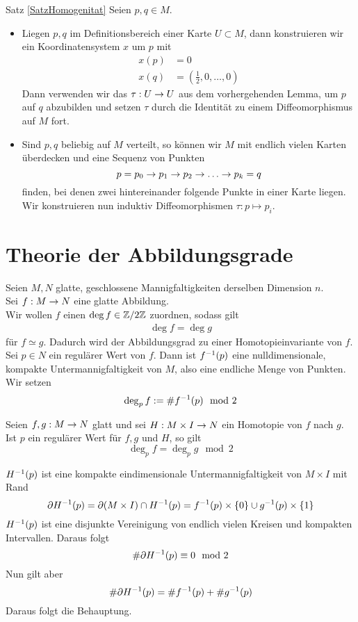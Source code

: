 \begin{Beweis}{Satz \ref{SatzHomogenitat}}
Seien $p, q \in M$.
\begin{itemize}
	\item Liegen $p,q$ im Definitionsbereich einer Karte $U \subset M$, dann konstruieren wir ein Koordinatensystem $x$ um $p$ mit
	\begin{align*}
	x(p) &= 0\\
	x(q) &= (\frac{1}{2}, 0, \ldots, 0)
	\end{align*}
	Dann verwenden wir das $\tau : U \overset{}{\rightarrow} U$ aus dem vorhergehenden Lemma, um $p$ auf $q$ abzubilden und setzen $\tau$ durch die Identität zu einem Diffeomorphismus auf $M$ fort.
	\item Sind $p,q$ beliebig auf $M$ verteilt, so können wir $M$ mit endlich vielen Karten überdecken und eine Sequenz von Punkten
	\[ p = p_0 \overset{}{\rightarrow} p_1 \overset{}{\rightarrow} p_2  \overset{}{\rightarrow} \ldots \overset{}{\rightarrow} p_k = q \]
	finden, bei denen zwei hintereinander folgende Punkte in einer Karte liegen. Wir konstruieren nun induktiv Diffeomorphismen $\tau : p \mapsto p_{i}$.
\end{itemize}
\end{Beweis}

\newpage
\section{Theorie der Abbildungsgrade}
Seien $M,N$ glatte, geschlossene Mannigfaltigkeiten derselben Dimension $n$. \\
Sei $f : M \overset{}{\rightarrow} N$ eine glatte Abbildung.\\
Wir wollen $f$ einen  $\deg f \in \mathbb{Z}/ 2\mathbb{Z}$ zuordnen, sodass gilt
\begin{align*}
\deg f = \deg g 
\end{align*}
für $f \simeq g$. Dadurch wird der Abbildungsgrad zu einer Homotopieinvariante von $f$.\\
Sei $p \in N$ ein regulärer Wert von $f$. Dann ist $f^{-1}(p)$ eine nulldimensionale, kompakte Untermannigfaltigkeit von $M$, also eine endliche Menge von Punkten. Wir setzen
\[ \deg_pf := \# f^{-1}(p) \mod 2 \]

\Lem{}
\label{GradLemma1}
Seien $f,g : M \overset{}{\rightarrow} N$ glatt und sei $H :M\times I \overset{}{\rightarrow} N$ ein Homotopie von $f$ nach $g$. Ist $p$ ein regulärer Wert für $f,g$ und $H$, so gilt
\[ \deg_pf = \deg_p g \mod 2 \]

\begin{Beweis}{}
	$H^{-1}(p)$ ist eine kompakte eindimensionale Untermannigfaltigkeit von $M \times I$ mit Rand
	\[ \partial H^{-1}(p) = \partial(M\times I) \cap H^{-1}(p) = f^{-1}(p) \times \{0\} \cup g^{-1}(p) \times \{1\} \]
	$H^{-1}(p)$ ist eine disjunkte Vereinigung von endlich vielen Kreisen und kompakten Intervallen. Daraus folgt
	\[ \# \partial H^{-1}(p) \equiv 0 \mod 2 \]
	Nun gilt aber
	\[ \# \partial H^{-1}(p) = \# f^{-1}(p) + \# g^{-1}(p) \]
	Daraus folgt die Behauptung.
\end{Beweis}

